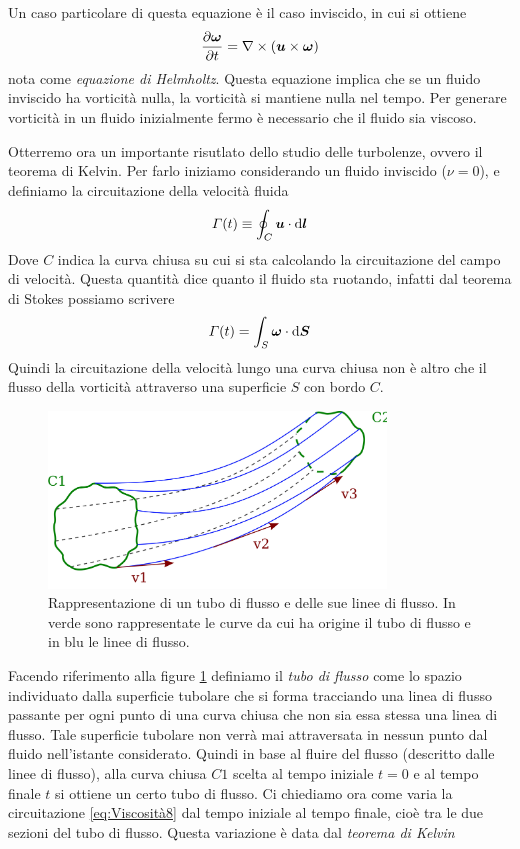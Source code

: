 Un caso particolare di questa equazione  è il caso inviscido, in cui si ottiene
\begin{equation}
\derP{\V{\omega}}{t} = \Rot{}(\vett{u}{\omega}) \label{eq:Viscosità12}
\end{equation}
nota come \textit{equazione di Helmholtz}. Questa equazione implica che se un fluido inviscido ha vorticità nulla, la vorticità si mantiene nulla nel tempo. Per generare vorticità in un fluido inizialmente fermo è necessario che il fluido sia viscoso. 


Otterremo ora un importante risutlato dello studio delle turbolenze, ovvero il teorema di Kelvin. Per farlo iniziamo considerando un fluido inviscido ($\nu=0$), e definiamo la circuitazione della velocità fluida 
\begin{equation}
\Gamma (t) \equiv \oint_C \scal{u}{} \dd \V{l} \label{eq:Viscosità8}
\end{equation}
Dove $C$ indica la curva chiusa su cui si sta calcolando la circuitazione del campo di velocità. Questa quantità dice quanto il fluido sta ruotando, infatti dal teorema di Stokes possiamo scrivere
\begin{equation}
\Gamma (t) = \int_S \scal{\omega}{}\dd \V{S}
\end{equation}
Quindi la circuitazione della velocità lungo una curva chiusa non è altro che il flusso della vorticità attraverso una superficie $S$ con bordo $C$. 
\begin{figure}
\begin{center}
\includegraphics[width=0.8\textwidth]{img/streamtube}
\caption{Rappresentazione di un tubo di flusso e delle sue linee di flusso. In verde sono rappresentate le curve da cui ha origine il tubo di flusso e in blu le linee di flusso.} \label{fig:streamtube}
\end{center}
\end{figure}
Facendo riferimento alla figure \ref{fig:streamtube} definiamo il \textit{tubo di flusso} come lo spazio individuato dalla superficie tubolare che si forma tracciando una linea di flusso passante per ogni punto di una curva chiusa che non sia essa stessa una linea di flusso. Tale superficie tubolare non verrà mai attraversata in nessun punto dal fluido nell'istante considerato. Quindi in base al fluire del flusso (descritto dalle linee di flusso), alla curva chiusa $C1$ scelta al tempo iniziale $t=0$ e al tempo finale $t$ si ottiene un certo tubo di flusso. Ci chiediamo ora come varia la circuitazione \ref{eq:Viscosità8} dal tempo iniziale al tempo finale, cioè tra le due sezioni del tubo di flusso. Questa variazione è data dal \textit{teorema di Kelvin}
